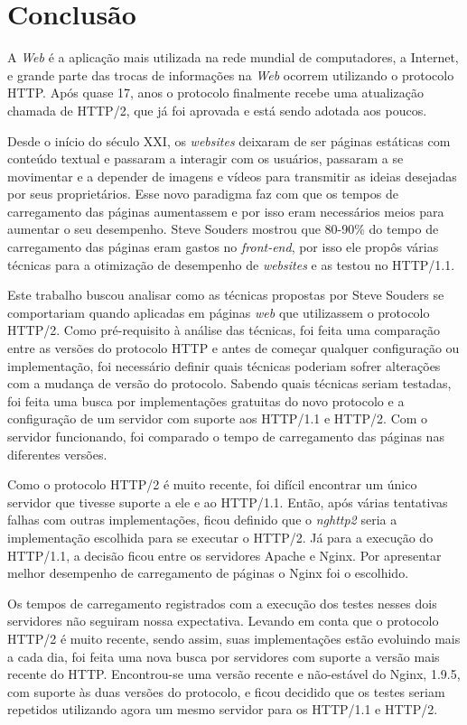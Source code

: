 %
%

\chapter{Conclusão}

A \textit{Web} é a aplicação mais utilizada na rede mundial de computadores, a Internet, e grande parte das trocas de informações na \textit{Web} ocorrem utilizando o protocolo HTTP. Após quase 17, anos o protocolo finalmente recebe uma atualização chamada de HTTP/2, que já foi aprovada e está sendo adotada aos poucos.

Desde o início do século XXI, os \textit{websites} deixaram de ser páginas estáticas com conteúdo textual e passaram a interagir com os usuários, passaram a se movimentar e a depender de imagens e vídeos para transmitir as ideias desejadas por seus proprietários. Esse novo paradigma faz com que os tempos de carregamento das páginas aumentassem e por isso eram necessários meios para aumentar o seu desempenho. Steve Souders mostrou que 80-90\% do tempo de carregamento das páginas eram gastos no \textit{front-end}, por isso ele propôs várias técnicas para a otimização de desempenho de \textit{websites} e as testou no HTTP/1.1.

Este trabalho buscou analisar como as técnicas propostas por Steve Souders se comportariam quando aplicadas em páginas \textit{web} que utilizassem o protocolo HTTP/2. Como pré-requisito à análise das técnicas, foi feita uma comparação entre as versões do protocolo HTTP e antes de começar qualquer configuração ou implementação, foi necessário definir quais técnicas poderiam sofrer alterações com a mudança de versão do protocolo. Sabendo quais técnicas seriam testadas, foi feita uma busca por implementações gratuitas do novo protocolo e a configuração de um servidor com suporte aos HTTP/1.1 e HTTP/2. Com o servidor funcionando, foi comparado o tempo de carregamento das páginas nas diferentes versões.

Como o protocolo HTTP/2 é muito recente, foi difícil encontrar um único servidor que tivesse suporte a ele e ao HTTP/1.1. Então, após várias tentativas falhas com outras implementações, ficou definido que o \textit{nghttp2} seria a implementação escolhida para se executar o HTTP/2. Já para a execução do HTTP/1.1, a decisão ficou entre os servidores Apache e Nginx. Por apresentar melhor desempenho de carregamento de páginas o Nginx foi o escolhido.

Os tempos de carregamento registrados com a execução dos testes nesses dois servidores não seguiram nossa expectativa. Levando em conta que o protocolo HTTP/2 é muito recente, sendo assim, suas implementações estão evoluindo mais a cada dia, foi feita uma nova busca por servidores com suporte a versão mais recente do HTTP. Encontrou-se uma versão recente e não-estável do Nginx, 1.9.5, com suporte às duas versões do protocolo, e ficou decidido que os testes seriam repetidos utilizando agora um mesmo servidor para os HTTP/1.1 e HTTP/2.

